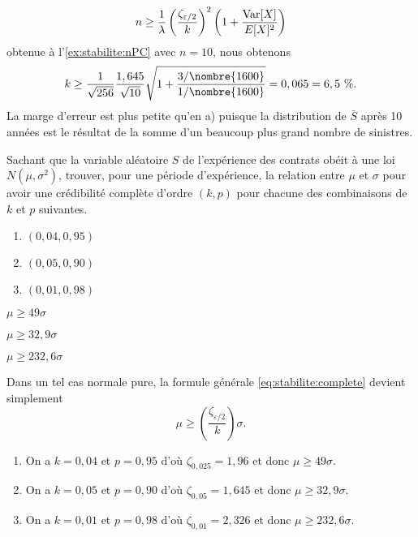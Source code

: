 \begin{exercice}
\begin{sol}
\begin{enumerate}
      \begin{displaymath}
        n \geq \frac{1}{\lambda}
        \left(
          \frac{\zeta_{\varepsilon/2}}{k}
        \right)^2
        \left(
          1 + \frac{\operatorname{Var} [ X ]}{E [ X ]^2}
        \right)
      \end{displaymath}
      obtenue à l'\autoref{ex:stabilite:nPC}
      avec $n = 10$, nous obtenons
      \begin{displaymath}
        k \geq
        \frac{1}{\sqrt{256}} \frac{1,645}{\sqrt{10}}
        \sqrt{1 + \frac{3/\nombre{1600}}{1/\nombre{1600}}} = 0,065 = 6,5~\%.
      \end{displaymath}
      La marge d'erreur est plus petite qu'en a) puisque la
      distribution de $\bar{S}$ après 10 années est le résultat de la
      somme d'un beaucoup plus grand nombre de sinistres.
    \end{enumerate}
  \end{sol}
\end{exercice}

\begin{exercice}
  Sachant que la variable aléatoire $S$ de l'expérience des contrats
  obéit à une loi $N(\mu, \sigma^2)$, trouver, pour une période
  d'expérience, la relation entre $\mu$ et $\sigma$ pour avoir une
  crédibilité complète d'ordre $(k, p)$ pour chacune des combinaisons
  de $k$ et $p$ suivantes.
  \begin{enumerate}
  \item $(0,04, 0,95)$
  \item $(0,05, 0,90)$
  \item $(0,01, 0,98)$
  \end{enumerate}
  \begin{rep}
    \begin{inparaenum}
    \item $\mu \geq 49 \sigma$
    \item $\mu \geq 32,9 \sigma$
    \item $\mu \geq 232,6 \sigma$
    \end{inparaenum}
  \end{rep}
  \begin{sol}
    Dans un tel cas normale pure, la formule générale
    \eqref{eq:stabilite:complete} devient simplement
    \begin{displaymath}
      \mu \geq \left( \frac{\zeta_{\varepsilon/2}}{k} \right)
      \sigma.
    \end{displaymath}
    \begin{enumerate}
    \item On a $k = 0,04$ et $p = 0,95$ d'où $\zeta_{0,025} = 1,96$ et
      donc $\mu \geq 49 \sigma$.
    \item On a $k = 0,05$ et $p = 0,90$ d'où $\zeta_{0,05} = 1,645$ et
      donc $\mu \geq 32,9 \sigma$.
    \item On a $k = 0,01$ et $p = 0,98$ d'où $\zeta_{0,01} = 2,326$ et
      donc $\mu \geq 232,6 \sigma$.
    \end{enumerate}
  \end{sol}
\end{exercice}

